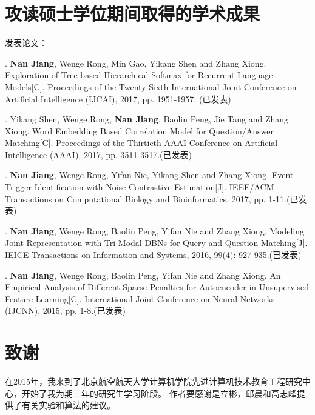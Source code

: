\chapter{攻读硕士学位期间取得的学术成果}
\noindent 发表论文：

. \textbf{Nan Jiang}, Wenge Rong, Min Gao, Yikang Shen and Zhang Xiong. Exploration of Tree-based Hierarchical Softmax for Recurrent Language Models[C]. Proceedings of the Twenty-Sixth International Joint Conference on Artificial Intelligence (IJCAI), 2017, pp. 1951-1957. (已发表)

. Yikang Shen, Wenge Rong, \textbf{Nan Jiang}, Baolin Peng, Jie Tang and Zhang Xiong. Word Embedding Based Correlation Model for Question/Answer Matching[C]. Proceedings of the Thirtieth {AAAI} Conference on Artificial Intelligence (AAAI), 2017, pp. 3511-3517.(已发表)

. \textbf{Nan Jiang}, Wenge Rong, Yifan Nie, Yikang Shen and Zhang Xiong. Event Trigger Identification with Noise Contrastive Estimation[J]. IEEE/ACM Transactions on Computational Biology and Bioinformatics, 2017, pp. 1-11.(已发表)

. \textbf{Nan Jiang}, Wenge Rong, Baolin Peng, Yifan Nie and Zhang Xiong. Modeling Joint Representation with Tri-Modal DBNs for Query and Question Matching[J]. IEICE Transactions on Information and Systems, 2016, 99(4): 927-935.(已发表)

. \textbf{Nan Jiang}, Wenge Rong, Baolin Peng, Yifan Nie and Zhang Xiong. An Empirical Analysis of Different Sparse Penalties
for Autoencoder in Unsupervised Feature Learning[C]. International Joint Conference on Neural Networks (IJCNN), 2015, pp. 1-8.(已发表)

\chapter{致\quad 谢}
在2015年，我来到了北京航空航天大学计算机学院先进计算机技术教育工程研究中心，开始了我为期三年的研究生学习阶段。
作者要感谢是立彬，邱晨和高志峰提供了有关实验和算法的建议。